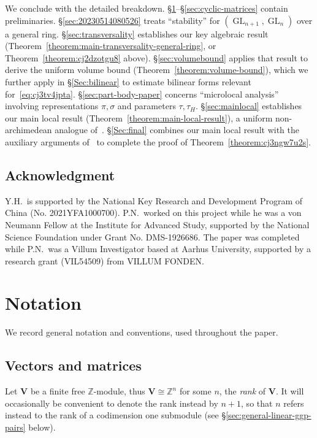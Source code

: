 \documentclass[reqno]{amsart}
\DeclareMathOperator{\GL}{GL}
\theoremstyle{plain} \newtheorem{theorem} {Theorem} \newtheorem{conjecture} {Conjecture} \newtheorem{corollary} [theorem] {Corollary} \newtheorem{proposition} [theorem] {Proposition} \newtheorem{fact} [theorem] {Fact}
\theoremstyle{definition} \newtheorem{definition} [theorem] {Definition}
\theoremstyle{itplain} %
\begin{document}
We conclude with the detailed breakdown.  \S\ref{sec:notation}--\S\ref{sec:cyclic-matrices} contain preliminaries.  \S\ref{sec:20230514080526} treats ``stability'' for $(\GL_{n+1}, \GL_n)$ over a general ring.  \S\ref{sec:transversality} establishes our key algebraic result (Theorem~\ref{theorem:main-transversality-general-ring}, or Theorem~\ref{theorem:cj2dzotgu8} above).  \S\ref{sec:volumebound} applies that result to derive the uniform volume bound (Theorem~\ref{theorem:volume-bound}), which we further apply in \S\ref{Sec:bilinear} to estimate bilinear forms relevant for~\eqref{eq:cj3tv4jpta}.  \S\ref{sec:part-body-paper} concerns ``microlocal analysis'' involving representations $\pi,\sigma$ and parameters $\tau,\tau_H$. \S\ref{sec:mainlocal} establishes our main local result (Theorem~\ref{theorem:main-local-result}), a uniform non-archimedean analogue of~\cite[Theorem 4.2]{2020arXiv201202187N}. \S\ref{Sec:final} combines our main local result with the auxiliary arguments of~\cite{2020arXiv201202187N} to complete the proof of Theorem~\ref{theorem:cj3ngw7u2s}.

\subsection{Acknowledgment}
Y.H.\ is supported by the National Key Research and Development Program of China (No. 2021YFA1000700).  P.N.\ worked on this project while he was a von Neumann Fellow at the Institute for Advanced Study, supported by the National Science Foundation under Grant No. DMS-1926686.  The paper was completed while P.N.\ was a Villum Investigator based at Aarhus University, supported by a research grant (VIL54509) from VILLUM FONDEN.


\section{Notation}\label{sec:notation}
We record general notation and conventions, used throughout the paper.

\subsection{Vectors and matrices}\label{sec:vectors-matrices}
Let $\mathbf{V}$ be a finite free $\mathbb{Z}$-module, thus $\mathbf{V} \cong \mathbb{Z}^n$ for some $n$, the \emph{rank} of $\mathbf{V}$.  It will occasionally be convenient to denote the rank instead by $n+1$, so that $n$ refers instead to the rank of a codimension one submodule (see \S\ref{sec:general-linear-ggp-pairs} below).
\end{document}

